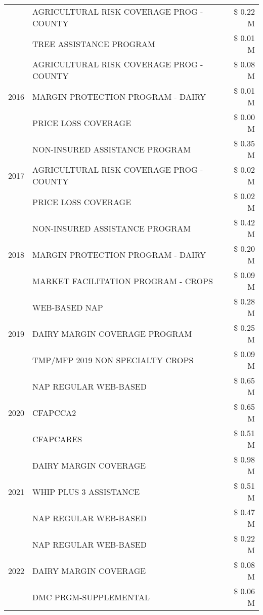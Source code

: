\begin{tabular}{llr}
 & AGRICULTURAL RISK COVERAGE PROG - COUNTY & \$ 0.22 M \\
 & TREE ASSISTANCE PROGRAM & \$ 0.01 M \\
\cline{1-3}
\multirow[t]{3}{*}{2016} & AGRICULTURAL RISK COVERAGE PROG - COUNTY & \$ 0.08 M \\
 & MARGIN PROTECTION PROGRAM - DAIRY & \$ 0.01 M \\
 & PRICE LOSS COVERAGE & \$ 0.00 M \\
\cline{1-3}
\multirow[t]{3}{*}{2017} & NON-INSURED ASSISTANCE PROGRAM & \$ 0.35 M \\
 & AGRICULTURAL RISK COVERAGE PROG - COUNTY & \$ 0.02 M \\
 & PRICE LOSS COVERAGE & \$ 0.02 M \\
\cline{1-3}
\multirow[t]{3}{*}{2018} & NON-INSURED ASSISTANCE PROGRAM & \$ 0.42 M \\
 & MARGIN PROTECTION PROGRAM - DAIRY & \$ 0.20 M \\
 & MARKET FACILITATION PROGRAM - CROPS & \$ 0.09 M \\
\cline{1-3}
\multirow[t]{3}{*}{2019} & WEB-BASED NAP & \$ 0.28 M \\
 & DAIRY MARGIN COVERAGE PROGRAM & \$ 0.25 M \\
 & TMP/MFP 2019 NON SPECIALTY CROPS & \$ 0.09 M \\
\cline{1-3}
\multirow[t]{3}{*}{2020} & NAP REGULAR WEB-BASED & \$ 0.65 M \\
 & CFAPCCA2 & \$ 0.65 M \\
 & CFAPCARES & \$ 0.51 M \\
\cline{1-3}
\multirow[t]{3}{*}{2021} & DAIRY MARGIN COVERAGE & \$ 0.98 M \\
 & WHIP PLUS 3 ASSISTANCE & \$ 0.51 M \\
 & NAP REGULAR WEB-BASED & \$ 0.47 M \\
\cline{1-3}
\multirow[t]{3}{*}{2022} & NAP REGULAR WEB-BASED & \$ 0.22 M \\
 & DAIRY MARGIN COVERAGE & \$ 0.08 M \\
 & DMC PRGM-SUPPLEMENTAL & \$ 0.06 M \\
\cline{1-3}
\bottomrule
\end{tabular}

